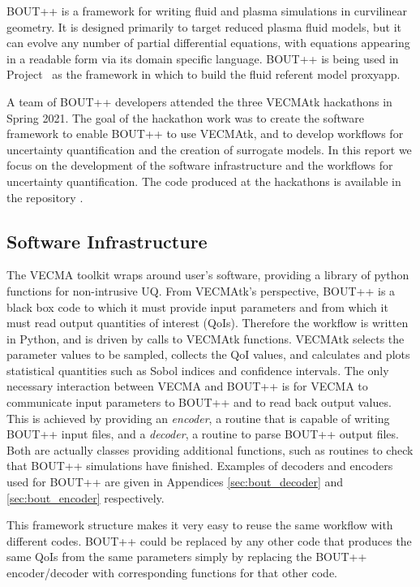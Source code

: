 
BOUT++ \cite{BOUT++,boutwebsite} is a framework for writing fluid and plasma simulations in curvilinear
geometry. 
It is designed primarily to target reduced plasma fluid models, but it can
evolve any number of partial differential equations, with equations appearing
in a readable form via its domain specific language.
BOUT++ is being used in Project \nep\ as the framework in which to build the
fluid referent model proxyapp.

A team of BOUT++ developers 
attended the three VECMAtk hackathons in Spring 2021.
The goal of the hackathon work was to create the software framework to enable
BOUT++ to use VECMAtk,
and to develop workflows for uncertainty quantification and the creation of
surrogate models.
In this report we focus on the development of the software infrastructure and
the workflows for uncertainty quantification.
The code produced at the hackathons is available in the repository \cite{bout_vecma_repo}.

\subsection{Software Infrastructure}\label{sec:VECMA}

The VECMA toolkit wraps around user's software, providing a library of python
functions for non-intrusive UQ.
From VECMAtk's perspective, BOUT++ is a black box code to which it must
provide input parameters and from which it must read output quantities of
interest (QoIs).
Therefore the workflow is written in Python,
and is driven by calls to VECMAtk functions.
VECMAtk selects the parameter values to be sampled,
collects the QoI values, 
and calculates and plots statistical quantities such as Sobol indices and
confidence intervals.
The only necessary interaction between VECMA and BOUT++ is for VECMA to
communicate input parameters to BOUT++ and to read back output values.
This is achieved by providing an \emph{encoder}, a routine that is capable of
writing BOUT++ input files,
and a \emph{decoder}, a routine to parse BOUT++ output files.
Both are actually classes providing additional functions, such as routines to
check that BOUT++ simulations have finished.
Examples of decoders and encoders used for BOUT++ are given in Appendices \ref{sec:bout_decoder} and \ref{sec:bout_encoder} respectively.

This framework structure makes it very easy to reuse the same workflow with
different codes.
BOUT++ could be replaced by any other code that produces the same QoIs from the
same parameters simply by replacing the BOUT++ encoder/decoder with
corresponding functions for that other code.

